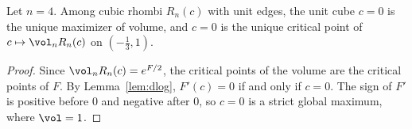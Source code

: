 \begin{theorem}\label{thm:main}
Let $n=4$. Among cubic rhombi $R_n(c)$ with unit edges, the unit cube $c=0$ is the unique maximizer of volume, and $c=0$ is the unique critical point of $c\mapsto\vol_nR_n(c)$ on $(- \frac{1}{3},1)$.
\end{theorem}
\begin{proof}
Since $\vol_nR_n(c)=e^{F/2}$, the critical points of the volume are the critical points of $F$.
By Lemma~\ref{lem:dlog}, $F'(c)=0$ if and only if $c=0$.
The sign of $F'$ is positive before $0$ and negative after $0$, so $c=0$ is a strict global maximum, where $\vol=1$.
\end{proof}
